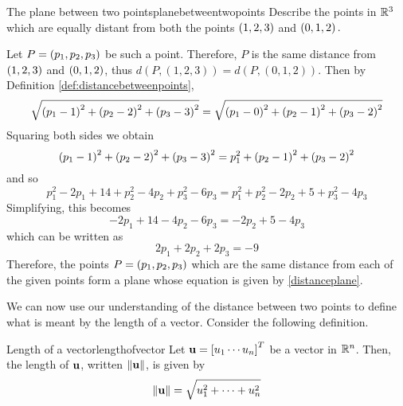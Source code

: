 \begin{example}{The plane between two points}{planebetweentwopoints}
Describe the points in $\mathbb{R}^3$ which are equally distant from both the points $\left(
1,2,3\right) $ and $\left(0,1,2\right) .$
\end{example}

\begin{solution}
Let $P = \left(p_1 , p_2, p_3\right) $ be such a point. Therefore, $P$ is the same distance from $\left(
1,2,3\right) $ and $\left(0,1,2\right) $, thus $d(P,(1,2,3))=d(P,(0,1,2))$.
Then by Definition \ref{def:distancebetweenpoints},
\begin{equation*}
\sqrt{\left(p_1 -1\right) ^{2}+\left(p_2 -2\right) ^{2}+\left(p_3-3\right) ^{2}}=
\sqrt{\left(p_1 - 0 \right)^{2}+\left(p_2-1\right) ^{2}+\left(p_3-2\right) ^{2}}
\end{equation*}
Squaring both sides we obtain 
\begin{equation*}
\left(p_1 -1\right) ^{2}+\left(p_2 -2\right) ^{2}+\left(p_3 -3\right)
^{2}=p_1^{2}+\left(p_2-1\right) ^{2}+\left(p_3 -2\right) ^{2}
\end{equation*}
and so
\begin{equation*}
\allowbreak p_1^{2}-2p_1+14+p_2^{2}-4p_2+p_3^{2}-6p_3=p_1^{2}+p_2^{2}-2p_2+5+p_3^{2}-4p_3
\end{equation*}
Simplifying, this becomes
\begin{equation*}
-2p_1+14-4p_2-6p_3=-2p_2+5-4p_3
\end{equation*}
which can be written as 
\begin{equation}
2p_1+2p_2+2p_3=-9  \label{distanceplane}
\end{equation}
Therefore, the points $P = \left(
p_1,p_2,p_3\right) $  which are the same 
distance from each of the given points form a plane whose equation is given by \ref{distanceplane}.
\end{solution}

We can now use our understanding of the distance between two points to define what is meant by the length of a 
vector. Consider the following definition.  

\begin{definition}{Length of a vector}{lengthofvector}
Let $\mbox{\bf u} = \left[u_{1} \cdots u_{n} \right]^T$ be a vector in
$\mathbb{R}^n$. Then, the length of $\mbox{\bf u}$, written $\|\mbox{\bf u}\|$, is given by
\begin{equation*}
\|
\mbox{\bf u}
\|
= \sqrt{ u_{1}^2 + \cdots + u_{n}^2}
\end{equation*}
\end{definition}

